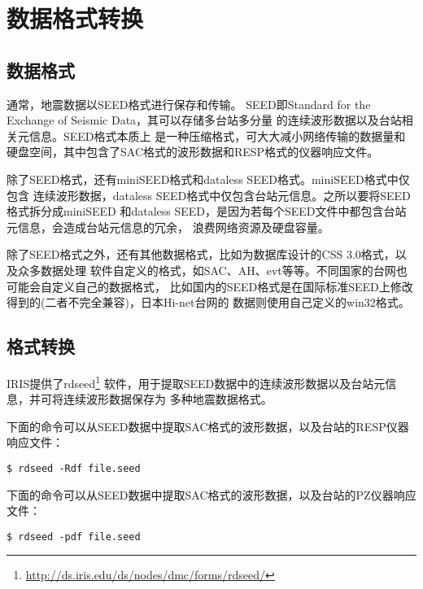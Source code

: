 \section{数据格式转换}
\subsection{数据格式}
通常，地震数据以SEED格式进行保存和传输。
SEED即Standard for the Exchange of Seismic Data，其可以存储多台站多分量%
的连续波形数据以及台站相关元信息。SEED格式本质上
是一种压缩格式，可大大减小网络传输的数据量和硬盘空间，其中包含了SAC格式的波形数据和RESP格式的仪器响应文件。

除了SEED格式，还有miniSEED格式和dataless SEED格式。miniSEED格式中仅包含
连续波形数据，dataless SEED格式中仅包含台站元信息。之所以要将SEED格式拆分成miniSEED
和dataless SEED，是因为若每个SEED文件中都包含台站元信息，会造成台站元信息的冗余，
浪费网络资源及硬盘容量。

除了SEED格式之外，还有其他数据格式，比如为数据库设计的CSS 3.0格式，以及众多数据处理
软件自定义的格式，如SAC、AH、evt等等。不同国家的台网也可能会自定义自己的数据格式，
比如国内的SEED格式是在国际标准SEED上修改得到的(二者不完全兼容)，日本Hi-net台网的
数据则使用自己定义的win32格式。

\subsection{格式转换}
IRIS提供了rdseed\footnote{\url{http://ds.iris.edu/ds/nodes/dmc/forms/rdseed/}}
软件，用于提取SEED数据中的连续波形数据以及台站元信息，并可将连续波形数据保存为
多种地震数据格式。

下面的命令可以从SEED数据中提取SAC格式的波形数据，以及台站的RESP仪器响应文件：
\begin{verbatim}
$ rdseed -Rdf file.seed
\end{verbatim}

下面的命令可以从SEED数据中提取SAC格式的波形数据，以及台站的PZ仪器响应文件：
\begin{verbatim}
$ rdseed -pdf file.seed
\end{verbatim}
